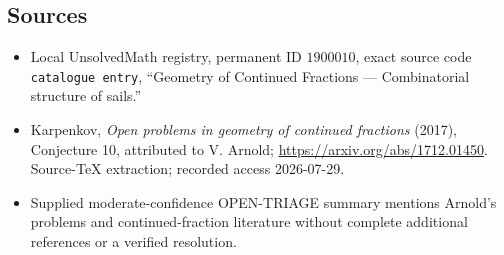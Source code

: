 \documentclass[11pt]{article}
\begin{document}
\subsection{Sources}
\begin{itemize}
\item Local UnsolvedMath registry, permanent ID \(1900010\), exact source code \texttt{catalogue entry}, ``Geometry of Continued Fractions --- Combinatorial structure of sails.''
\item Karpenkov, \emph{Open problems in geometry of continued fractions} (2017), Conjecture 10, attributed to V. Arnold; \url{https://arxiv.org/abs/1712.01450}. Source-TeX extraction; recorded access 2026-07-29.
\item Supplied moderate-confidence OPEN-TRIAGE summary mentions Arnold's problems and continued-fraction literature without complete additional references or a verified resolution.
\end{itemize}
\end{document}
